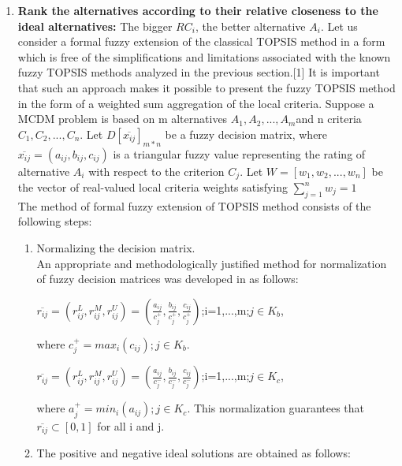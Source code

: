 \documentclass[12pt,a4paper]{article}
\begin{document}
\begin{enumerate}
\item \textbf{Rank the alternatives according to their relative closeness to the ideal alternatives:} The bigger $RC_{i}$, the better alternative $A_{i}$. Let us consider a formal fuzzy extension of the classical TOPSIS method in a form which is free of the simplifications and limitations associated with the known fuzzy TOPSIS methods analyzed in the previous section.[1] It is important that such an approach makes it possible to present the fuzzy TOPSIS method in the form of a weighted sum aggregation of the local criteria. Suppose a MCDM problem is based on m alternatives $A_{1}, A_{2}, ... , A_{m} $and n criteria $C_{1}, C_{2}, ... , C_{n}$. Let $D[\overline{x_{ij}}]_{m*n}$ be a fuzzy decision matrix, where $\overline{x_{ij}}=(a_{ij},b_{ij},c_{ij})$ is a triangular fuzzy value representing the rating of alternative $A_{i}$ with respect
to the criterion $C_{j}$. Let $W = [w_{1},w_{2}, ... , w_{n}]$ be the vector of real-valued local criteria weights satisfying $\sum\limits^{n}_{j=1}w_{j}=1$\\

The method of formal fuzzy extension of TOPSIS method consists of the following steps:
\begin{enumerate}
    \item Normalizing the decision matrix.\\
An appropriate and methodologically justified method for normalization of fuzzy decision matrices was developed in as follows:
\begin{center}
$\overline{r_{ij}}=(r_{ij}^{L},r_{ij}^{M},r_{ij}^{U})=(\frac{a_{ij}}{c_{j}^{+}},\frac{b_{ij}}{c_{j}^{+}},\frac{c_{ij}}{c_{j}^{+}})$;i=1,...,m;$j \in K_{b}$,
    
\end{center}

where $c^{+}_{j}=max_{i}(c_{ij});j \in K_{b}$.

\begin{center}

$\overline{r_{ij}}=(r_{ij}^{L},r_{ij}^{M},r_{ij}^{U})=(\frac{a_{ij}}{c_{j}^{-}},\frac{b_{ij}}{c_{j}^{-}},\frac{c_{ij}}{c_{j}^{-}})$;i=1,...,m;$j \in K_{c}$,
    
\end{center}
where $a^{+}_{j}=min_{i}(a_{ij});j \in K_{c}$.
This normalization guarantees that $\overline{r_{ij}}\subset [0,1]$ for all i and j.


\item The positive and negative ideal solutions are obtained as follows:


\end{enumerate}
\end{enumerate}
\end{document}
